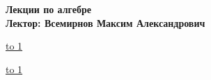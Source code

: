 \documentclass[12pt,a4paper]{article}
\begin{document}
\begin{center}
  {\Large \bf Лекции по алгебре} \\ 
  \vspace{0.5em}
  {\Large \bf Лектор: Всемирнов Максим Александрович} \\
\end{center}

\vspace{-1em}
\noindent \underline{\hbox to 1\textwidth{{ } \hfil{ } \hfil{ } }}

\vspace{1em}
\tableofcontents
\pagebreak



























\noindent \underline{\hbox to 1\textwidth{{ } \hfil{ } \hfil{ } }}
\end{document}

